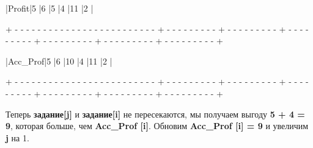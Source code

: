 \begin{tcolorbox}
\hspace{0.4mm}|\hspace{17.6mm}Profit\hspace{17.6mm}|\hspace{7.1mm}5\hspace{7.1mm} |\hspace{7.1mm}6\hspace{7.1mm} |\hspace{7.1mm}5\hspace{7.1mm} |\hspace{7.1mm}4\hspace{7.1mm} |\hspace{5.8mm}11\hspace{5.8mm} |\hspace{7.1mm}2\hspace{7.1mm} |

{\tiny{+ - - - - - - - - - - - - - - - - - - - - - - - - - + - - - - - - - - - + - - - - - - - - - + - - - - - - - - - + - - - - - - - - - + - - - - - - - - - + - - - - - - - - - +}}

\hspace{0.4mm}|\hspace{14mm}Acc\_Prof\hspace{14mm}|\hspace{7.1mm}5\hspace{7.1mm} |\hspace{7.1mm}6\hspace{7.1mm} |\hspace{6mm}10\hspace{6mm} |\hspace{7.1mm}4\hspace{7.1mm} |\hspace{5.8mm}11\hspace{5.8mm} |\hspace{7.1mm}2\hspace{7.1mm} |

{\tiny{+ - - - - - - - - - - - - - - - - - - - - - - - - - + - - - - - - - - - + - - - - - - - - - + - - - - - - - - - + - - - - - - - - - + - - - - - - - - - + - - - - - - - - - +}}
\end{tcolorbox}

\vspace{\baselineskip}
Теперь \textbf{задание[j]} и \textbf{задание[i]} не пересекаются, мы получаем выгоду \textbf{5 + 4 = 9}, которая больше, чем \textbf{Acc\_Prof [i]}. Обновим \textbf{Acc\_Prof [i] = 9} и увеличим \textbf{j} на 1. 

